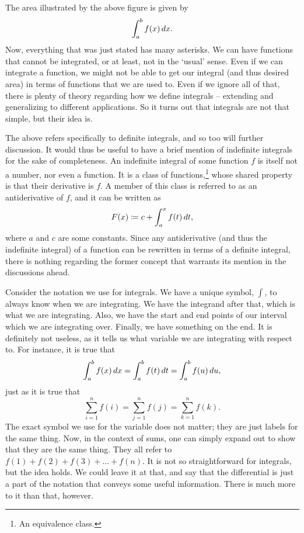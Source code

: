 \documentclass[a4paper,12pt]{article}
\begin{document}
The area illustrated by the above figure is given by
\begin{equation*}
    \int_{a}^{b} f(x) \mathop{}\!d x.
\end{equation*}
Now, everything that was just stated has many asterisks.
We can have functions that cannot be integrated, or at least, not in the `usual' sense.
Even if we can integrate a function, we might not be able to get our integral (and thus desired area) in terms of functions that we are used to.
Even if we ignore all of that, there is plenty of theory regarding how we define integrals -- extending and generalizing to different applications.
So it turns out that integrals are not that simple, but their idea is.

The above refers specifically to definite integrals, and so too will further discussion.
It would thus be useful to have a brief mention of indefinite integrals for the sake of completeness.
An indefinite integral of some function $f$ is itself not a number, nor even a function.
It is a class of functions,\footnote{An equivalence class.} whose shared property is that their derivative is $f$.
A member of this class is referred to as an antiderivative of $f$, and it can be written as
\begin{equation*}
    F(x) \coloneq c + \int_{a}^{x} f(t) \mathop{}\!d t,
\end{equation*}
where $a$ and $c$ are some constants.
Since any antiderivative (and thus the indefinite integral) of a function can be rewritten in terms of a definite integral, there is nothing regarding the former concept that warrants its mention in the discussions ahead.

Consider the notation we use for integrals.
We have a unique symbol, $\int$, to always know when we are integrating.
We have the integrand after that, which is what we are integrating.
Also, we have the start and end points of our interval which we are integrating over.
Finally, we have something on the end.
It is definitely not useless, as it tells us what variable we are integrating with respect to.
For instance, it is true that
\begin{equation*}
    \int_{a}^{b} f(x) \mathop{}\!d x = \int_{a}^{b} f(t) \mathop{}\!d t = \int_{a}^{b} f(u) \mathop{}\!d u,
\end{equation*}
just as it is true that
\begin{equation*}
    \sum_{i=1}^{n} f(i) = \sum_{j=1}^{n} f(j) = \sum_{k=1}^{n} f(k).
\end{equation*}
The exact symbol we use for the variable does not matter; they are just labels for the same thing.
Now, in the context of sums, one can simply expand out to show that they are the same thing.
They all refer to $f(1) + f(2) + f(3) + \ldots + f(n)$.
It is not so straightforward for integrals, but the idea holds.
We could leave it at that, and say that the differential is just a part of the notation that conveys some useful information.
There is much more to it than that, however.
\end{document}
